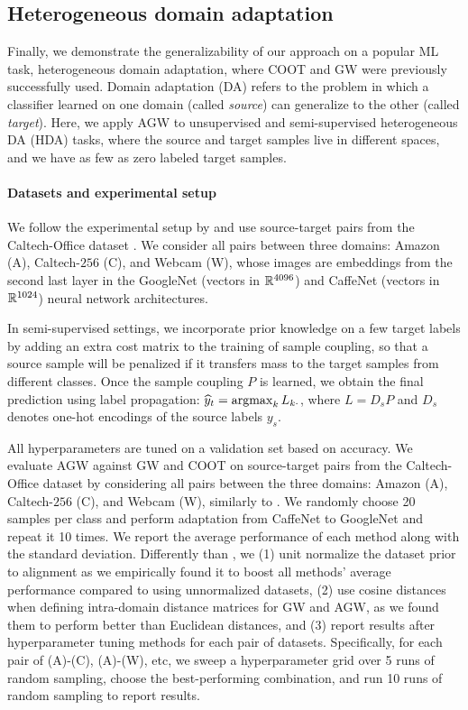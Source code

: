 \subsection{Heterogeneous domain adaptation}

Finally, we demonstrate the generalizability of our approach on a popular ML task,
heterogeneous domain adaptation, where COOT and GW were previously successfully used.
Domain adaptation (DA) refers to the problem in which a classifier learned on one domain
(called \textit{source}) can generalize to the other (called \textit{target}). Here,
we apply AGW to unsupervised and semi-supervised heterogeneous DA (HDA) tasks,
where the source and target samples live in different spaces, and we have as few as
zero labeled target samples.

\paragraph{Datasets and experimental setup}
We follow the experimental setup by \citet{Redko20} and use source-target pairs
from the Caltech-Office dataset \citep{Saenko10}. We consider all pairs between three domains:
Amazon (A), Caltech-$256$ (C), and Webcam (W), whose images are embeddings from
the second last layer in the GoogleNet \citep{Szegedy15} (vectors in $\mathbb R^{4096}$)
and CaffeNet \citep{Jia14} (vectors in $\mathbb R^{1024}$) neural network architectures.

In semi-supervised settings, we incorporate prior knowledge on a few target labels
by adding an extra cost matrix to the training of sample coupling, so that
a source sample will be penalized if it transfers mass to the target samples from different classes.
Once the sample coupling $P$ is learned, we obtain the final prediction using label propagation:
$\widehat{y}_t = \operatorname*{argmax}_k L_{k\cdot}$,
where $L = D_s P$ and $D_s$ denotes one-hot encodings of the source labels $y_s$.

All hyperparameters are tuned on a validation set based on accuracy.
We evaluate AGW against GW and COOT on source-target pairs from the Caltech-Office dataset
\citep{Saenko10} by considering all pairs between the three domains: Amazon (A), Caltech-$256$ (C),
and Webcam (W), similarly to \citep{Redko20}. We randomly choose 20 samples per class
and perform adaptation from CaffeNet to GoogleNet and repeat it 10 times.
We report the average performance of each method along with the standard deviation.
Differently than \citep{Redko20}, we (1) unit normalize the dataset prior to alignment
as we empirically found it to boost all methods' average performance compared to using
unnormalized datasets, (2) use cosine distances when defining intra-domain distance matrices
for GW and AGW, as we found them to perform better than Euclidean distances,
and (3) report results after hyperparameter tuning methods for each pair of datasets.
Specifically, for each pair of (A)-(C), (A)-(W), etc, we sweep a hyperparameter grid over
5 runs of random sampling, choose the best-performing combination, and run
10 runs of random sampling to report results.

